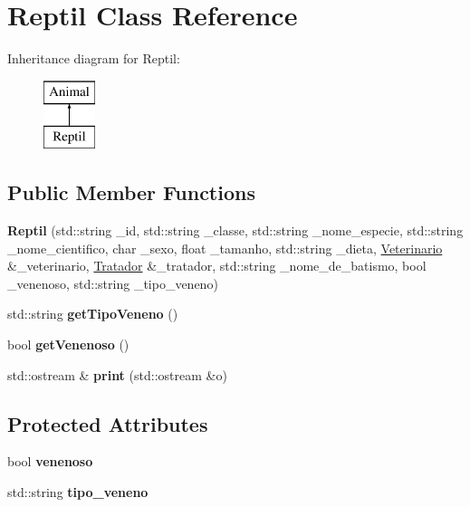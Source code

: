 \hypertarget{classReptil}{}\section{Reptil Class Reference}
\label{classReptil}
Inheritance diagram for Reptil\+:\begin{figure}[H]
\begin{center}
\leavevmode
\includegraphics[height=2.000000cm]{classReptil}
\end{center}
\end{figure}
\subsection*{Public Member Functions}
\begin{DoxyCompactItemize}
\item 
\mbox{\label{classReptil_aae8f6accbf1eff6e060b011a43349730}} 
{\bfseries Reptil} (std\+::string \+\_\+id, std\+::string \+\_\+classe, std\+::string \+\_\+nome\+\_\+especie, std\+::string \+\_\+nome\+\_\+cientifico, char \+\_\+sexo, float \+\_\+tamanho, std\+::string \+\_\+dieta, \hyperlink{classVeterinario}{Veterinario} \&\+\_\+veterinario, \hyperlink{classTratador}{Tratador} \&\+\_\+tratador, std\+::string \+\_\+nome\+\_\+de\+\_\+batismo, bool \+\_\+venenoso, std\+::string \+\_\+tipo\+\_\+veneno)
\item 
\mbox{\label{classReptil_aa5e4cd3fa2d94916a3ba5cc20299d3cf}} 
std\+::string {\bfseries get\+Tipo\+Veneno} ()
\item 
\mbox{\label{classReptil_a75138aaa91420a9f82ddd39c19ea8b78}} 
bool {\bfseries get\+Venenoso} ()
\item 
\mbox{\label{classReptil_a8bcbdba3b28482246ec7820f73649aee}} 
std\+::ostream \& {\bfseries print} (std\+::ostream \&o)
\end{DoxyCompactItemize}
\subsection*{Protected Attributes}
\begin{DoxyCompactItemize}
\item 
\mbox{\label{classReptil_a7cdfbf53287364cf8f7582cf1f8c3ad6}} 
bool {\bfseries venenoso}
\item 
\mbox{\label{classReptil_add2a1f28ecb68b69b000ccdfa76b530f}} 
std\+::string {\bfseries tipo\+\_\+veneno}
\end{DoxyCompactItemize}


